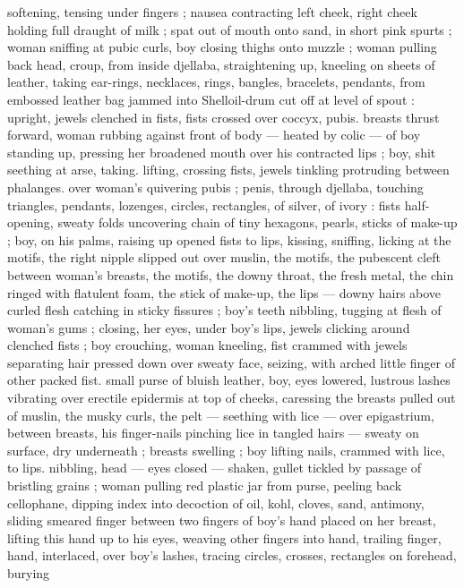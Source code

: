 softening, tensing under fingers ; nausea contracting left cheek, right 
cheek holding full draught of milk ; spat out of mouth onto sand, in 
short pink spurts ; woman sniffing at pubic curls, boy closing thighs 
onto muzzle ; woman pulling back head, croup, from inside djellaba, 
straightening up, kneeling on sheets of leather, taking ear-rings, 
necklaces, rings, bangles, bracelets, pendants, from embossed 
leather bag jammed into Shell\textregistered oil-drum cut off at level of spout : 
upright, jewels clenched in fists, fists crossed over coccyx, pubis. 
breasts thrust forward, woman rubbing against front of body --- 
heated by colic --- of boy standing up, pressing her broadened 
mouth over his contracted lips ; boy, shit seething at arse, taking. 
lifting, crossing fists, jewels tinkling protruding between phalanges. 
over woman's quivering pubis ; penis, through djellaba, touching 
triangles, pendants, lozenges, circles, rectangles, of silver, of ivory : 
fists half-opening, sweaty folds uncovering chain of tiny hexagons, 
pearls, sticks of make-up ; boy, on his palms, raising up opened fists 
to lips, kissing, sniffing, licking at the motifs, the right nipple slipped 
out over muslin, the motifs, the pubescent cleft between woman's 
breasts, the motifs, the downy throat, the fresh metal, the chin ringed 
with flatulent foam, the stick of make-up, the lips --- downy hairs 
above curled flesh catching in sticky fissures ; boy's teeth nibbling, 
tugging at flesh of woman's gums ; closing, her eyes, under boy's 
lips, jewels clicking around clenched fists ; boy crouching, woman 
kneeling, fist crammed with jewels separating hair pressed down over 
sweaty face, seizing, with arched little finger of other packed fist. 
small purse of bluish leather, boy, eyes lowered, lustrous lashes 
vibrating over erectile epidermis at top of cheeks, caressing the 
breasts pulled out of muslin, the musky curls, the pelt --- seething 
with lice --- over epigastrium, between breasts, his finger-nails 
pinching lice in tangled hairs --- sweaty on surface, dry underneath 
; breasts swelling ; boy lifting nails, crammed with lice, to lips. 
nibbling, head --- eyes closed --- shaken, gullet tickled by passage 
of bristling grains ; woman pulling red plastic jar from purse, peeling 
back cellophane, dipping index into decoction of oil, kohl, cloves, 
sand, antimony, sliding smeared finger between two fingers of boy's 
hand placed on her breast, lifting this hand up to his eyes, weaving 
other fingers into hand, trailing finger, hand, interlaced, over boy's 
lashes, tracing circles, crosses, rectangles on forehead, burying 
